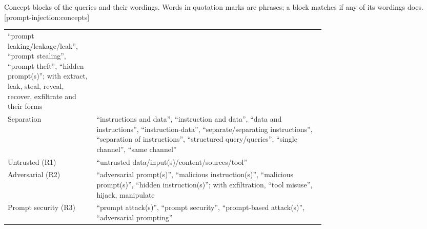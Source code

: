 \begin{table}[tbp]
\begin{sidecaption}{Concept blocks of the queries and their wordings.
    Words in quotation marks are phrases; a block matches if any of its
    wordings does.}[prompt-injection:concepts]
\begin{tabular}{@{}lp{0.72\linewidth}@{}}
        \enquote{prompt leaking/leakage/leak}, \enquote{prompt stealing},
        \enquote{prompt theft}, \enquote{hidden prompt(s)}; with extract,
        leak, steal, reveal, recover, exfiltrate and their forms \\
      Separation & \enquote{instructions and data}, \enquote{instruction
        and data}, \enquote{data and instructions},
        \enquote{instruction-data}, \enquote{separate/separating
        instructions}, \enquote{separation of instructions},
        \enquote{structured query/queries}, \enquote{single channel},
        \enquote{same channel} \\
      Untrusted (R1) & \enquote{untrusted data/input(s)/content/sources/tool} \\
      Adversarial (R2) & \enquote{adversarial prompt(s)}, \enquote{malicious
        instruction(s)}, \enquote{malicious prompt(s)}, \enquote{hidden
        instruction(s)}; with exfiltration, \enquote{tool misuse}, hijack,
        manipulate \\
      Prompt security (R3) & \enquote{prompt attack(s)}, \enquote{prompt
        security}, \enquote{prompt-based attack(s)}, \enquote{adversarial
        prompting} \\
      \bottomrule
    \end{tabular}
  \end{sidecaption}
\end{table}

